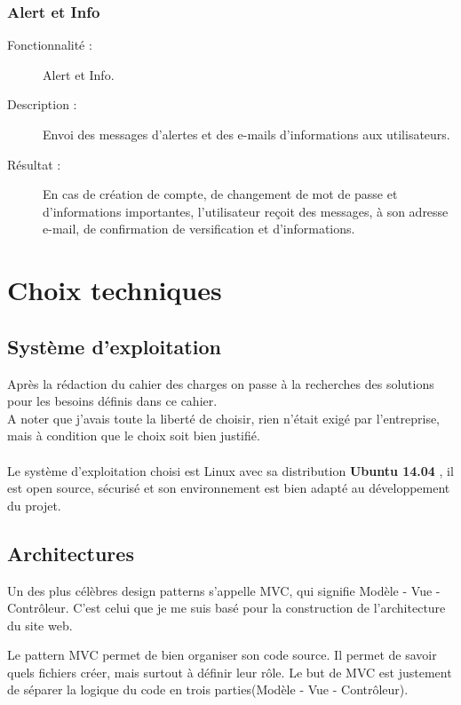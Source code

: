 \documentclass[12pt]{article}
\begin{document}
\subsubsection{Alert et Info}
\begin{description}

\item[Fonctionnalité :] Alert et Info.

\item[Description :]  Envoi des messages d'alertes et des e-mails d'informations aux utilisateurs.

\item[Résultat :]  En cas de création de compte, de changement de mot de passe et d'informations importantes, 
l'utilisateur reçoit des messages, à son adresse e-mail, de confirmation de versification et d'informations.
\end{description}



\newpage 

\section{ Choix techniques}


\subsection{Système d'exploitation}
Après la rédaction du cahier des charges  on passe à la recherches des solutions pour les besoins définis dans ce cahier. \\
A noter que j'avais toute la liberté de choisir, rien n'était exigé par l'entreprise, mais à condition que 
le choix soit bien justifié.\\ \\

Le système d'exploitation choisi est Linux avec sa distribution \textbf{Ubuntu 14.04} , il est open source, sécurisé et son environnement est bien adapté au développement du projet. 

\subsection{Architectures}
Un des plus célèbres design patterns s'appelle MVC, qui signifie Modèle - Vue - Contrôleur. C'est celui que je me suis basé pour la construction de l’architecture du site web.

Le pattern MVC permet de bien organiser son code source. Il permet de savoir quels fichiers créer, mais surtout à définir leur rôle. Le but de MVC est justement de séparer la logique du code en trois parties(Modèle - Vue - Contrôleur).\\
\end{document}
